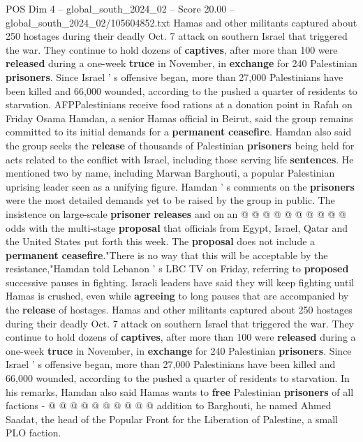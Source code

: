 \begin{textsample}{POS Dim 4 – global\_south\_2024\_02 – Score 20.00 – global\_south\_2024\_02/105604852.txt}  \label{ex:f4_pos_080}
Hamas and other militants captured about 250 hostages during their deadly Oct. 7 attack on southern Israel that triggered the war.
They continue to hold dozens of \textbf{captives}, after more than 100 were \textbf{released} during a one-week \textbf{truce} in November, in \textbf{exchange} for 240 Palestinian \textbf{prisoners}.
Since Israel ' s offensive began, more than 27,000 Palestinians have been killed and 66,000 wounded, according to the pushed a quarter of residents to starvation.
AFPPalestinians receive food rations at a donation point in Rafah on Friday Osama Hamdan, a senior Hamas official in Beirut, said the group remains committed to its initial demands for a \textbf{permanent} \textbf{ceasefire}.
Hamdan also said the group seeks the \textbf{release} of thousands of Palestinian \textbf{prisoners} being held for acts related to the conflict with Israel, including those serving life \textbf{sentences}.
He mentioned two by name, including Marwan Barghouti, a popular Palestinian uprising leader seen as a unifying figure.
Hamdan ' s comments on the \textbf{prisoners} were the most detailed demands yet to be raised by the group in public.
The insistence on large-scale \textbf{prisoner} \textbf{releases} and on an @ @ @ @ @ @ @ @ @ @ odds with the multi-stage \textbf{proposal} that officials from Egypt, Israel, Qatar and the United States put forth this week.
The \textbf{proposal} does not include a \textbf{permanent} \textbf{ceasefire}."There is no way that this will be acceptable by the resistance,"Hamdan told Lebanon ' s LBC TV on Friday, referring to \textbf{proposed} successive pauses in fighting.
Israeli leaders have said they will keep fighting until Hamas is crushed, even while \textbf{agreeing} to long pauses that are accompanied by the \textbf{release} of hostages.
Hamas and other militants captured about 250 hostages during their deadly Oct. 7 attack on southern Israel that triggered the war.
They continue to hold dozens of \textbf{captives}, after more than 100 were \textbf{released} during a one-week \textbf{truce} in November, in \textbf{exchange} for 240 Palestinian \textbf{prisoners}.
Since Israel ' s offensive began, more than 27,000 Palestinians have been killed and 66,000 wounded, according to the pushed a quarter of residents to starvation.
In his remarks, Hamdan also said Hamas wants to \textbf{free} Palestinian \textbf{prisoners} of all factions - @ @ @ @ @ @ @ @ @ @ addition to Barghouti, he named Ahmed Saadat, the head of the Popular Front for the Liberation of Palestine, a small PLO faction.

\end{textsample}
